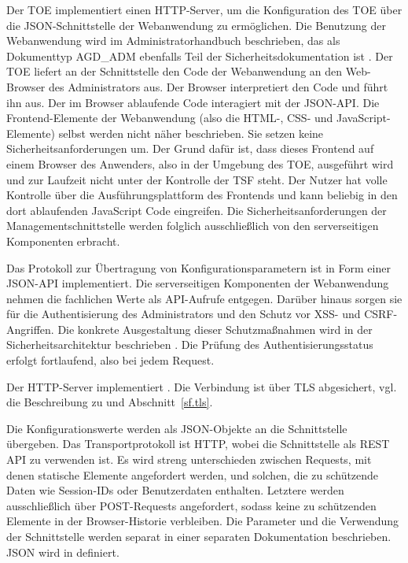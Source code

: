 

Der TOE implementiert einen HTTP-Server, um die Konfiguration des TOE über die
JSON-Schnittstelle der Webanwendung zu ermöglichen. Die Benutzung der
Webanwendung wird im Administratorhandbuch beschrieben, das als Dokumenttyp
AGD\_ADM ebenfalls Teil der Sicherheitsdokumentation ist \autocite{agd_adm}. Der
TOE liefert an der Schnittstelle \lslanhttpmgmt{} den Code der Webanwendung an
den Web-Browser des Administrators aus. Der Browser interpretiert den Code und
führt ihn aus. Der im Browser ablaufende Code interagiert mit der JSON-API. Die
Frontend-Elemente der Webanwendung (also die HTML-, CSS- und
JavaScript-Elemente) selbst werden nicht näher beschrieben. Sie setzen keine
Sicherheitsanforderungen um. Der Grund dafür ist, dass dieses Frontend auf einem
Browser des Anwenders, also in der Umgebung des TOE, ausgeführt wird und zur
Laufzeit nicht unter der Kontrolle der TSF steht. Der Nutzer hat volle Kontrolle
über die Ausführungsplattform des Frontends und kann beliebig in den dort
ablaufenden JavaScript Code eingreifen. Die Sicherheitsanforderungen der
Managementschnittstelle werden folglich ausschließlich von den serverseitigen
Komponenten erbracht.

Das Protokoll zur Übertragung von Konfigurationsparametern ist in Form einer
JSON-API implementiert. Die serverseitigen Komponenten der Webanwendung nehmen
die fachlichen Werte als API-Aufrufe entgegen. Darüber hinaus sorgen sie für die
Authentisierung des Administrators und den Schutz vor XSS- und
CSRF-Angriffen. Die konkrete Ausgestaltung dieser Schutzmaßnahmen wird in der
Sicherheitsarchitektur beschrieben
\autocite{adv_arc}. Die Prüfung des Authentisierungsstatus
erfolgt fortlaufend, also bei jedem Request.




Der HTTP-Server implementiert . Die Verbindung ist über TLS
abgesichert, vgl. die Beschreibung zu \lslantls{} und
Abschnitt~\ref{sf.tls}.

Die Konfigurationswerte werden als JSON-Objekte an die Schnittstelle
übergeben. Das Transportprotokoll ist HTTP, wobei die Schnittstelle als REST API
zu verwenden ist. Es wird streng unterschieden zwischen Requests, mit denen
statische Elemente angefordert werden, und solchen, die zu schützende Daten wie
Session-IDs oder Benutzerdaten enthalten. Letztere werden ausschließlich über
POST-Requests angefordert, sodass keine zu schützenden Elemente in der
Browser-Historie verbleiben. Die Parameter und die Verwendung der Schnittstelle
werden separat in einer separaten Dokumentation beschrieben. JSON wird in
 definiert.


